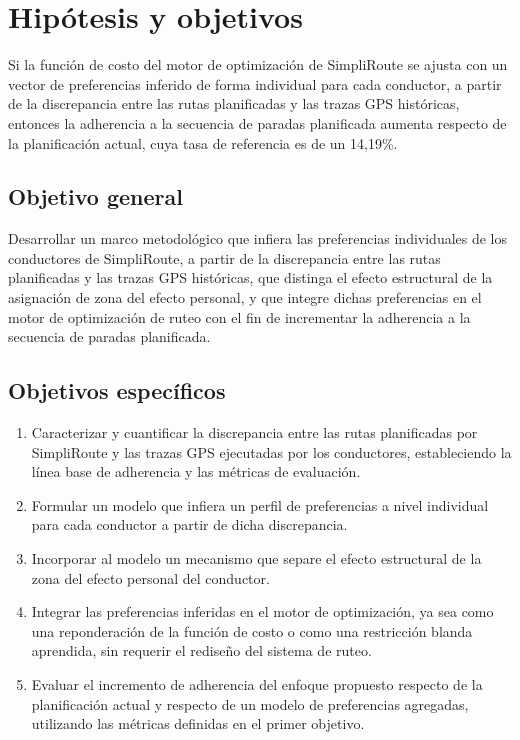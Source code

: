 \chapter{Hipótesis y objetivos} %
\label{sec:Hipotesis} %


 
 
Si la función de costo del motor de optimización de SimpliRoute se ajusta con un vector de preferencias inferido de forma individual para cada conductor, a partir de la discrepancia entre las rutas planificadas y las trazas GPS históricas, entonces la adherencia a la secuencia de paradas planificada aumenta respecto de la planificación actual, cuya tasa de referencia es de un 14,19\%.

 
\section{Objetivo general}
 
Desarrollar un marco metodológico que infiera las preferencias individuales de los conductores de SimpliRoute, a partir de la discrepancia entre las rutas planificadas y las trazas GPS históricas, que distinga el efecto estructural de la asignación de zona del efecto personal, y que integre dichas preferencias en el motor de optimización de ruteo con el fin de incrementar la adherencia a la secuencia de paradas planificada.
 
\section{Objetivos específicos}
 
\begin{enumerate}
    \item Caracterizar y cuantificar la discrepancia entre las rutas planificadas por SimpliRoute y las trazas GPS ejecutadas por los conductores, estableciendo la línea base de adherencia y las métricas de evaluación.
    \item Formular un modelo que infiera un perfil de preferencias a nivel individual para cada conductor a partir de dicha discrepancia.
    \item Incorporar al modelo un mecanismo que separe el efecto estructural de la zona del efecto personal del conductor.
    \item Integrar las preferencias inferidas en el motor de optimización, ya sea como una reponderación de la función de costo o como una restricción blanda aprendida, sin requerir el rediseño del sistema de ruteo.
    \item Evaluar el incremento de adherencia del enfoque propuesto respecto de la planificación actual y respecto de un modelo de preferencias agregadas, utilizando las métricas definidas en el primer objetivo.
\end{enumerate}
 